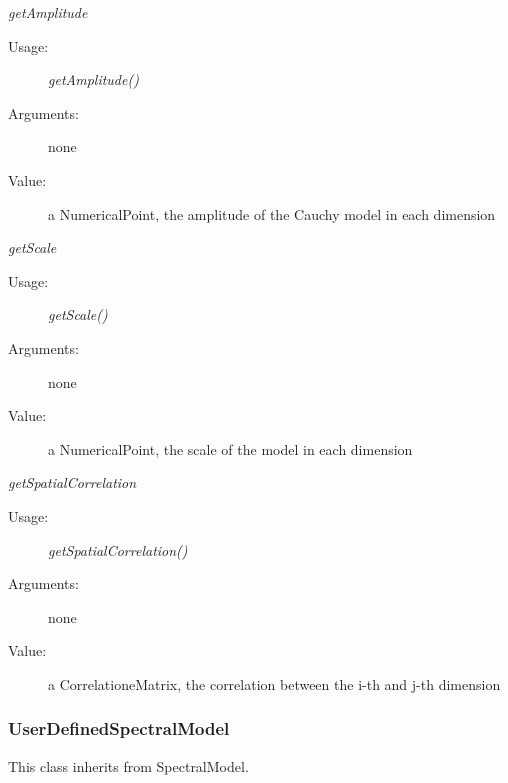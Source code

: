 \begin{description}
\begin{description}
\item \textit{getAmplitude}
\begin{description}
\item[Usage:] \textit{getAmplitude()}
\item[Arguments:] none
\item[Value:]   a NumericalPoint, the amplitude of the Cauchy model in each dimension
\end{description}
\bigskip

\item \textit{getScale}
\begin{description}
\item[Usage:] \textit{getScale()}
\item[Arguments:] none
\item[Value:]   a NumericalPoint, the scale of the model in each dimension
\end{description}
\bigskip

\item \textit{getSpatialCorrelation}
\begin{description}
\item[Usage:] \textit{getSpatialCorrelation()}
\item[Arguments:] none
\item[Value:]   a CorrelationeMatrix, the correlation between the i-th and j-th dimension
\end{description}
\bigskip


\end{description}

\end{description}


\newpage
\subsubsection{UserDefinedSpectralModel}
This class inherits from SpectralModel.\\


